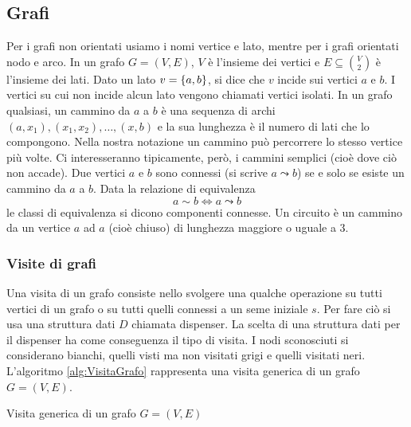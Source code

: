 \subsection*{Grafi}
Per i grafi non orientati usiamo i nomi vertice e lato, mentre per i grafi orientati nodo e arco. In un grafo $G=(V,E)$, $V$ è l'insieme dei vertici e $E\subseteq\binom{V}{2}$ è l'insieme dei lati.
Dato un lato $v=\left\{ a,b \right\}$, si dice che $v$ incide sui vertici $a$ e $b$. I vertici su cui non incide alcun lato vengono chiamati vertici isolati.
In un grafo qualsiasi, un cammino da $a$ a $b$ è una sequenza di archi $(a,x_1),(x_1,x_2),\dots,(x,b)$ e la sua lunghezza è il numero di lati che lo compongono. Nella nostra notazione un cammino può percorrere lo stesso vertice più volte. Ci interesseranno tipicamente, però, i cammini semplici (cioè dove ciò non accade). Due vertici $a$ e $b$ sono connessi (si scrive $a\leadsto b$) se e solo se esiste un cammino da $a$ a $b$. Data la relazione di equivalenza
\begin{equation*}
	a\sim b \iff a\leadsto b
\end{equation*}
le classi di equivalenza si dicono componenti connesse. Un circuito è un cammino da un vertice $a$ ad $a$ (cioè chiuso) di lunghezza maggiore o uguale a $3$.

\subsubsection*{Visite di grafi}
Una visita di un grafo consiste nello svolgere una qualche operazione su tutti vertici di un grafo o su tutti quelli connessi a un seme iniziale $s$. Per fare ciò si usa una struttura dati $D$ chiamata dispenser. La scelta di una struttura dati per il dispenser ha come conseguenza il tipo di visita. I nodi sconosciuti si considerano bianchi, quelli visti ma non visitati grigi e quelli visitati neri. L'algoritmo \ref{alg:VisitaGrafo} rappresenta una visita generica di un grafo $G=(V,E)$.

\begin{algorithm}
	
	\caption{Visita generica di un grafo $G=(V,E)$}
	\label{alg:VisitaGrafo}
\end{algorithm}
